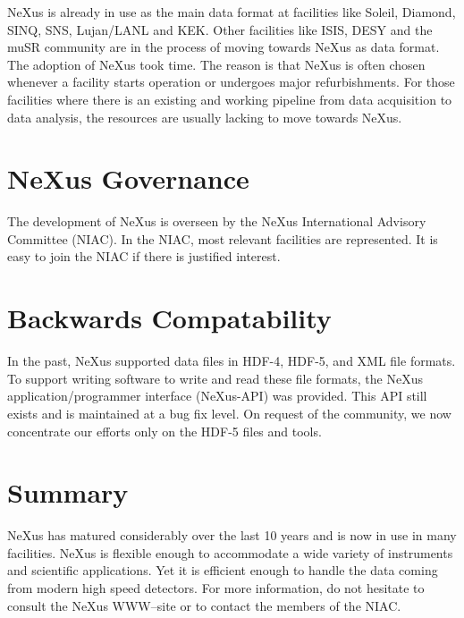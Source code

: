\documentclass[%
 aip,
rsi,
 amsmath,amssymb,
 reprint,%
]{revtex4-1}
\begin{document}
NeXus is already in use as the main data format at facilities like Soleil, Diamond, SINQ, SNS, Lujan/LANL 
and KEK. Other facilities like ISIS, DESY and the muSR community are in the process of moving towards 
NeXus as  data format. The adoption of NeXus took time. The reason is that NeXus is often chosen whenever 
a facility starts operation or undergoes major refurbishments. For those facilities where there is an existing and working 
pipeline from data acquisition to data analysis,  the resources are usually lacking to move 
towards NeXus.

\section{NeXus Governance}

The development of NeXus is overseen by the NeXus International Advisory Committee (NIAC). 
In the NIAC, most relevant facilities are represented. It is easy to join the NIAC if 
there is justified interest. 

\section{Backwards Compatability}

In the past, NeXus supported data files in HDF-4, HDF-5, and XML file formats. 
To support writing software to write and read these file formats, the NeXus
application/programmer interface (NeXus-API) was provided.
This API still exists and is maintained at a bug fix level.
On request of the community, we now concentrate our efforts only
on the HDF-5 files and tools.

\section{Summary}

NeXus has matured considerably over the last 10 years and is now in use in many facilities. NeXus 
is flexible enough to accommodate a wide variety of instruments and scientific applications. 
Yet it is efficient enough to 
handle the data coming from modern high speed detectors. For more information,
do not hesitate to consult the NeXus WWW--site\cite{nxwww} or to contact
the members of the NIAC. 



\nocite{*}
\end{document}
